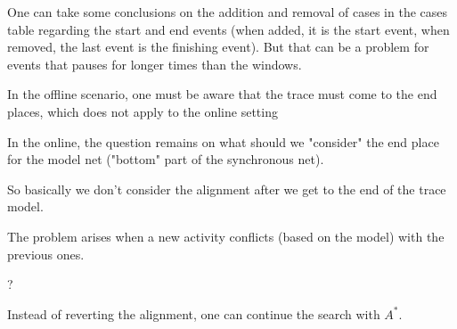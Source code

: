 \nextslides[until=114] 

One can take some conclusions on the addition and removal of cases in the cases table regarding the start and end events (when added, it is the start event, when removed, the last event is the finishing event). But that can be a problem for events that pauses for longer times than the windows.

\nextslides[until=117,highlight=117,slide=116]

\nextslides[until=121,highlight=121] 

In the offline scenario, one must be aware that the trace must come to the end places, which does not apply to the online setting

\nextslides[until=128] 

In the online, the question remains on what should we "consider" the end place for the model net ("bottom" part of the synchronous net).

\nextslides[until=130,highlight=130] 

So basically we don't consider the alignment after we get to the end of the trace model.

\nextslides[until=144] 

The problem arises when a new activity conflicts (based on the model) with the previous ones.

\nextslides[until=149] 

?

\nextslides[until=150,highlight=150] 

Instead of reverting the alignment, one can continue the search with $A^*$.

\nextslides[until=152,highlight=152]


